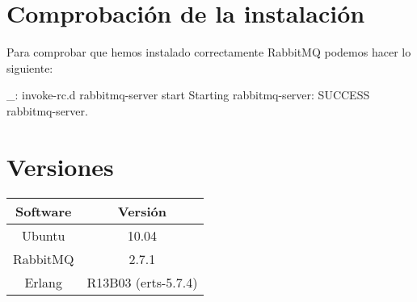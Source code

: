 \section{Comprobación de la instalación}

Para comprobar que hemos instalado correctamente RabbitMQ podemos hacer lo siguiente:

\begin{bashcode}
_: invoke-rc.d rabbitmq-server start
Starting rabbitmq-server: SUCCESS
rabbitmq-server.
\end{bashcode}


\section{Versiones}

\begin{tabular}{|c|c|}
   \hline
   Software & Versión \\ \hline
   Ubuntu & 10.04 \\ \hline
   RabbitMQ & 2.7.1 \\ \hline
   Erlang & R13B03 (erts-5.7.4) \\ \hline
\end{tabular}
